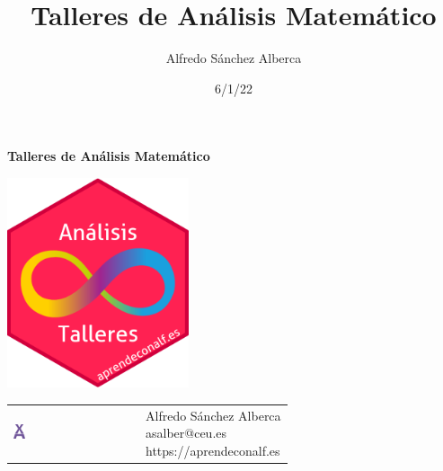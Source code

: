 \documentclass[
  a4paper,
]{scrreport}
\title{Talleres de Análisis Matemático}
\author{Alfredo Sánchez Alberca}
\date{6/1/22}
\renewcommand*\contentsname{Tabla de contenidos}
\newcommand\contentsname{Tabla de contenidos}
\begin{document}
\begin{titlepage}

\begin{center}
\vspace*{5cm}

\Huge
{\textbf{\textsf{Talleres de Análisis Matemático}}}

\vspace{0.5cm}
\LARGE
{\textbf{\textsf{}}}

\vspace{1.5cm}

\includegraphics[width=0.4\textwidth]{img/logos/sticker.png}
\end{center}

\vfill

\begin{flushleft}
\begin{tabular}{ll}
\includegraphics[width=0.1\textwidth]{img/logos/aprendeconalf.png} & \parbox[b]{5cm}{\Large\textsf{Alfredo
Sánchez
Alberca}\\ \textsf{asalber@ceu.es} \\ \textsf{https://aprendeconalf.es}}
\end{tabular}
\end{flushleft}
\end{titlepage}\ifdefined\Shaded\renewenvironment{Shaded}{\begin{tcolorbox}[borderline west={3pt}{0pt}{shadecolor}, frame hidden, boxrule=0pt, enhanced, breakable, interior hidden, sharp corners]}{\end{tcolorbox}}\fi

\renewcommand*\contentsname{Tabla de contenidos}
{
\hypersetup{linkcolor=}
\setcounter{tocdepth}{2}
\tableofcontents
}
\end{document}
